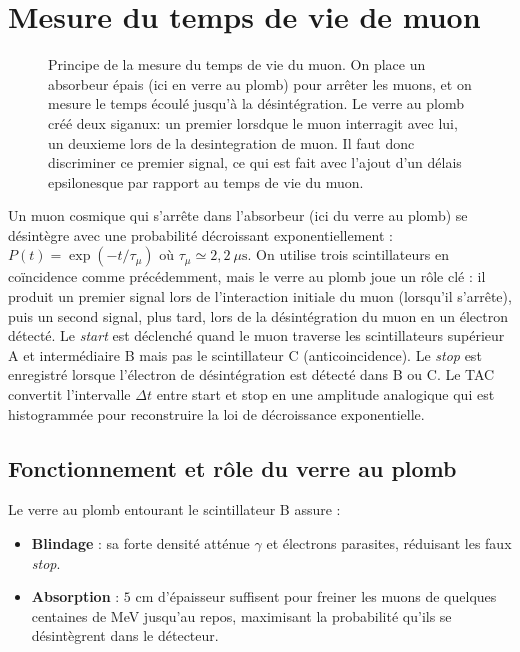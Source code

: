 \documentclass[a4paper,12pt,twoside]{article}
\begin{document}
\section{Mesure du temps de vie de muon}

\begin{figure}[!h]
  \centering
  
  \caption{Principe de la mesure du temps de vie du muon.
On place un absorbeur épais (ici en verre au plomb) pour arrêter les muons, et on mesure le temps écoulé jusqu'à la désintégration. Le verre au plomb créé deux siganux: un premier lorsdque le muon interragit avec lui, un deuxieme lors de la desintegration de muon. Il faut donc discriminer ce premier signal, ce qui est fait avec l'ajout d'un délais epsilonesque par rapport au temps de vie du muon.} 
  \label{fig:muon_lifetime}
\end{figure}


\begin{center}
\begin{tcolorbox}[colback=blue!5!white, colframe=blue!60!black, title=Principe de la mesure du temps de vie du muon]
Un muon cosmique qui s’arrête dans l’absorbeur (ici du verre au plomb) se désintègre avec une probabilité décroissant exponentiellement : $P(t)=\exp(-t/\tau_\mu)$ où $\tau_\mu\simeq2{,}2~\mu\text{s}$.  
On utilise trois scintillateurs en coïncidence comme précédemment, mais le verre au plomb joue un rôle clé : il produit un premier signal lors de l’interaction initiale du muon (lorsqu’il s’arrête), puis un second signal, plus tard, lors de la désintégration du muon en un électron détecté.  
Le \textit{start} est déclenché quand le muon traverse les scintillateurs supérieur A et intermédiaire B mais pas le scintillateur C (anticoincidence).  
Le \textit{stop} est enregistré lorsque l’électron de désintégration est détecté dans B ou C.  
Le TAC convertit l’intervalle $\Delta t$ entre start et stop en une amplitude analogique qui est histogrammée pour reconstruire la loi de décroissance exponentielle.
\end{tcolorbox}
\end{center}


\subsection*{Fonctionnement et rôle du verre au plomb}
Le verre au plomb entourant le scintillateur B assure :
\begin{itemize}
  \item \textbf{Blindage} : sa forte densité atténue $\gamma$ et électrons parasites, réduisant les faux \textit{stop}.  
  \item \textbf{Absorption} : $5$ cm d'épaisseur suffisent pour freiner les muons de quelques centaines de MeV jusqu'au repos, maximisant la probabilité qu'ils se désintègrent dans le détecteur.
\end{itemize}
\end{document}
